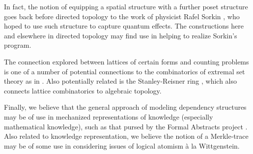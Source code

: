 \documentclass[hoptionsi,review,format=acmsmall]{acmart}
\theoremstyle{definition}
\begin{document}
In fact, the notion of equipping a spatial structure with a further poset structure goes back before directed topology to the work of physicist Rafel Sorkin \cite{sorkin1983posets}, who hoped to use such structure to capture quantum effects. The constructions here and elsewhere in directed topology may find use in helping to realize Sorkin's program.

The connection explored between lattices of certain forms and counting problems is one of a number of potential connections to the combinatorics of extremal set theory as in \cite{stanley2013algebraic}. Also potentially related is the Stanley-Reisner ring \cite{francisco2014survey}, which also connects lattice combinatorics to algebraic topology.

Finally, we believe that the general approach of modeling dependency structures may be of use in mechanized representations of knowledge (especially mathematical knowledge), such as that pursed by the Formal Abstracts project \cite{fabstract}. Also related to knowledge representation, we believe the notion of a Merkle-trace may be of some use in considering issues of logical atomism à la Wittgenstein.



%






 \nocite{*}
 
 
\end{document}
